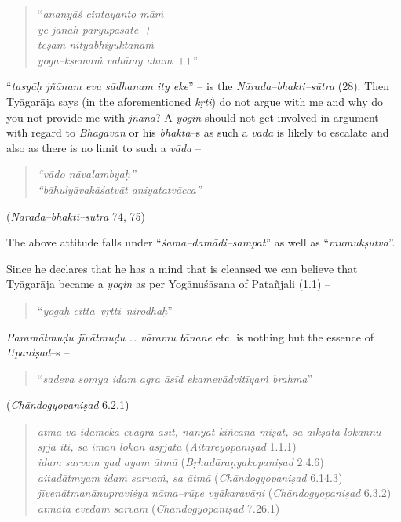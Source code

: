 \begin{verse}
“\textit{ananyāś cintayanto māṁ}\\\textit{ye janāḥ paryupāsate~।}\\\textit{teṣāṁ nityābhiyuktānāṁ}\\\textit{yoga–kṣemaṁ vahāmy aham}~।।”
\end{verse}

“\textit{tasyāḥ jñānam eva sādhanam ity eke}” – is the \textit{Nārada–bhakti–sūtra} (28). Then Tyāgarāja says (in the aforementioned \textit{kṛti}) do not argue with me and why do you not provide me with \textit{jñāna}? A \textit{yogin} should not get involved in argument with regard to \textit{Bhagavān} or his \textit{bhakta}–s as such a \textit{vāda} is likely to escalate and also as there is no limit to such a \textit{vāda} –

\begin{verse}
\textit{“vādo nāvalambyaḥ”}\\\textit{“bāhulyāvakāśatvāt aniyatatvācca”}
\end{verse}

\begin{flushright}
(\textit{Nārada–bhakti–sūtra} 74, 75)
\end{flushright}

The above attitude falls under “\textit{śama–damādi–sampat}” as well as “\textit{mumukṣutva}”.

Since he declares that he has a mind that is cleansed we can believe that Tyāgarāja became a \textit{yogin} as per Yogānuśāsana of Patañjali (1.1) –

\begin{verse}
“\textit{yogaḥ citta–vṛtti–nirodhaḥ}”
\end{verse}

\textit{Paramātmuḍu jīvātmuḍu … vāramu tānane} etc. is nothing but the essence of \textit{Upaniṣad}–s –

\begin{verse}
“\textit{sadeva somya idam agra āsīd ekamevādvitīyaṁ brahma}”
\end{verse}

\begin{flushright}
(\textit{Chāndogyopaniṣad} 6.2.1)
\end{flushright}

\begin{verse}
\textit{ātmā vā idameka evāgra āsīt, nānyat kiñcana miṣat, sa aikṣata lokānnu}\\\textit{sṛjā iti, sa imān lokān asṛjata} (\textit{Aitareyopaniṣad} 1.1.1)\\\textit{idam sarvam yad ayam ātmā} (\textit{Bṛhadāraṇyakopaniṣad} 2.4.6)\\\textit{aitadātmyam idaṁ sarvaṁ, sa ātmā} (\textit{Chāndogyopaniṣad} 6.14.3)\\\textit{jīvenātmanānupraviśya nāma–rūpe vyākaravāṇi} (\textit{Chāndogyopaniṣad} 6.3.2)\\\textit{ātmata evedam sarvam} (\textit{Chāndogyopaniṣad} 7.26.1)
\end{verse}


